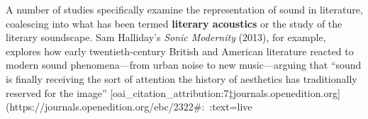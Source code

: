 \documentclass[12pt]{report}
\begin{document}
A number of studies specifically examine the representation of sound in literature, coalescing into what has been termed \textbf{literary acoustics} or the study of the literary soundscape. Sam Halliday’s \textit{Sonic Modernity} (2013), for example, explores how early twentieth-century British and American literature reacted to modern sound phenomena—from urban noise to new music—arguing that “sound is finally receiving the sort of attention the history of aesthetics has traditionally reserved for the image” [oai_citation_attribution:7‡journals.openedition.org](https://journals.openedition.org/ebc/2322#:~:text=live%
\end{document}
